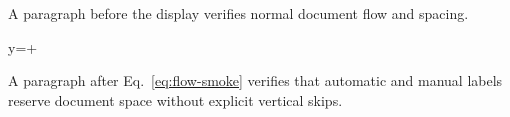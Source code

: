 \documentclass{article}
\begin{document}
A paragraph before the display verifies normal document flow and spacing.
\begin{annotatedequation}[numbered]
y=+
\label{eq:flow-smoke}
\end{annotatedequation}
A paragraph after Eq.~\ref{eq:flow-smoke} verifies that automatic and manual labels reserve document space without explicit vertical skips.
\end{document}
